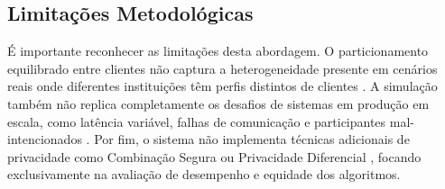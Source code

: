 \subsection{Limitações Metodológicas}

É importante reconhecer as limitações desta abordagem. O particionamento equilibrado entre clientes não captura a heterogeneidade presente em cenários reais onde diferentes instituições têm perfis distintos de clientes \cite{zhu2021noniid}. A simulação também não replica completamente os desafios de sistemas em produção em escala, como latência variável, falhas de comunicação e participantes mal-intencionados \cite{miao2022byzantine}. Por fim, o sistema não implementa técnicas adicionais de privacidade como Combinação Segura \cite{bonawitz2017secagg} ou Privacidade Diferencial \cite{geyer2017differential}, focando exclusivamente na avaliação de desempenho e equidade dos algoritmos.
